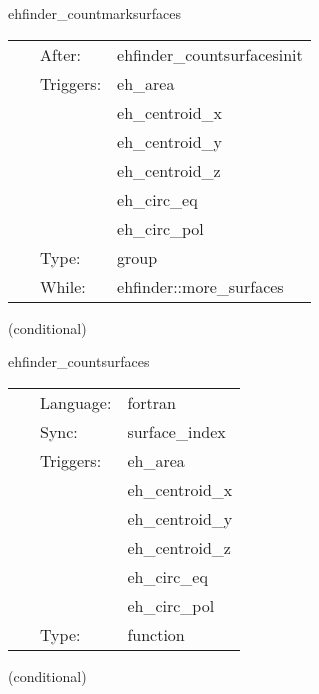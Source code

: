 \hspace{5mm} ehfinder\_countmarksurfaces 

\hspace{5mm}{\it counting and mark surfaces } 


\hspace{5mm}

 \begin{tabular*}{160mm}{cll} 
~ & After:  & ehfinder\_countsurfacesinit \\ 
~ & Triggers:  & eh\_area \\ 
~& ~ &eh\_centroid\_x\\ 
~& ~ &eh\_centroid\_y\\ 
~& ~ &eh\_centroid\_z\\ 
~& ~ &eh\_circ\_eq\\ 
~& ~ &eh\_circ\_pol\\ 
~ & Type:  & group \\ 
~ & While:  & ehfinder::more\_surfaces \\ 
\end{tabular*} 


\vspace{5mm}

   (conditional) 

\hspace{5mm} ehfinder\_countsurfaces 

\hspace{5mm}{\it check if there are more surfaces } 


\hspace{5mm}

 \begin{tabular*}{160mm}{cll} 
~ & Language:  & fortran \\ 
~ & Sync:  & surface\_index \\ 
~ & Triggers:  & eh\_area \\ 
~& ~ &eh\_centroid\_x\\ 
~& ~ &eh\_centroid\_y\\ 
~& ~ &eh\_centroid\_z\\ 
~& ~ &eh\_circ\_eq\\ 
~& ~ &eh\_circ\_pol\\ 
~ & Type:  & function \\ 
\end{tabular*} 


\vspace{5mm}

   (conditional) 

